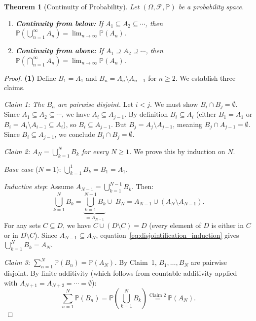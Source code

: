 \documentclass[11pt,a4paper]{article}
\theoremstyle{definition}
\theoremstyle{plain}
\newtheorem{theorem}{Theorem}[section]
\theoremstyle{remark}
\newcommand{\Prob}{\mathbb{P}}
\begin{document}
\begin{theorem}[Continuity of Probability]
\label{thm:continuity}
Let $(\Omega, \mathcal{F}, \Prob)$ be a probability space.
\begin{enumerate}[nosep]
    \item \textbf{Continuity from below:} If $A_1 \subseteq A_2 \subseteq \cdots$, then $\Prob\!\left(\bigcup_{n=1}^\infty A_n\right) = \lim_{n \to \infty} \Prob(A_n)$.
    \item \textbf{Continuity from above:} If $A_1 \supseteq A_2 \supseteq \cdots$, then $\Prob\!\left(\bigcap_{n=1}^\infty A_n\right) = \lim_{n \to \infty} \Prob(A_n)$.
\end{enumerate}
\end{theorem}

\begin{proof}
\textbf{(1)} Define $B_1 = A_1$ and $B_n = A_n \setminus A_{n-1}$ for $n \geq 2$. We establish three claims.

\medskip
\textit{Claim 1: The $B_n$ are pairwise disjoint.}
Let $i < j$. We must show $B_i \cap B_j = \emptyset$.
Since $A_1 \subseteq A_2 \subseteq \cdots$, we have $A_i \subseteq A_{j-1}$. By definition $B_i \subseteq A_i$ (either $B_1 = A_1$ or $B_i = A_i \setminus A_{i-1} \subseteq A_i$), so $B_i \subseteq A_{j-1}$.
But $B_j = A_j \setminus A_{j-1}$, meaning $B_j \cap A_{j-1} = \emptyset$. Since $B_i \subseteq A_{j-1}$, we conclude $B_i \cap B_j = \emptyset$.

\medskip
\textit{Claim 2: $A_N = \bigcup_{k=1}^N B_k$ for every $N \geq 1$.}
We prove this by induction on $N$.

\emph{Base case} ($N = 1$): $\bigcup_{k=1}^1 B_k = B_1 = A_1$. \checkmark

\emph{Inductive step}: Assume $A_{N-1} = \bigcup_{k=1}^{N-1} B_k$. Then:
\begin{equation}
    \bigcup_{k=1}^N B_k = \underbrace{\bigcup_{k=1}^{N-1} B_k}_{= A_{N-1}} \cup\; B_N
    = A_{N-1} \cup (A_N \setminus A_{N-1}).
    \label{eq:disjointification_induction}
\end{equation}
For any sets $C \subseteq D$, we have $C \cup (D \setminus C) = D$ (every element of $D$ is either in $C$ or in $D \setminus C$). Since $A_{N-1} \subseteq A_N$, equation~\eqref{eq:disjointification_induction} gives $\bigcup_{k=1}^N B_k = A_N$. \checkmark

\medskip
\textit{Claim 3: $\sum_{n=1}^N \Prob(B_n) = \Prob(A_N)$.}
By Claim~1, $B_1, \ldots, B_N$ are pairwise disjoint. By finite additivity (which follows from countable additivity applied with $A_{N+1} = A_{N+2} = \cdots = \emptyset$):
\begin{equation}
    \sum_{n=1}^N \Prob(B_n) = \Prob\!\left(\bigcup_{k=1}^N B_k\right) \overset{\text{Claim 2}}{=} \Prob(A_N).
    \label{eq:finite_additivity_step}
\end{equation}


\end{proof}
\end{document}
